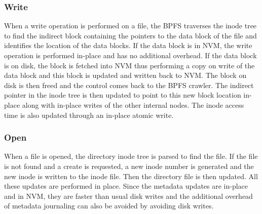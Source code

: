 \subsubsection{Write}
When a write operation is performed on a file, the BPFS traverses the inode tree to find the indirect block containing the pointers to the data block of the file and identifies the location of the data blocks. If the data block is in NVM, the write operation is performed in-place and has no additional overhead. If the data block is on disk, the block is fetched into NVM thus performing a copy on write of the data block and this block is updated and written back to NVM. The block on disk is then freed and the control comes back to the BPFS crawler. The indirect pointer in the inode tree is then updated to point to this new block location in-place along with in-place writes of the other internal nodes. The inode access time is also updated through an in-place atomic write.

\subsubsection{Open}
When a file is opened, the directory inode tree is parsed to find the file. If the file is not found and a create is requested, a new inode number is generated and the new inode is written to the inode file. Then the directory file is then updated. All these updates are performed in place. Since the metadata updates are in-place and in NVM, they are faster than usual disk writes and the additional overhead of metadata journaling can also be avoided by avoiding disk writes.
